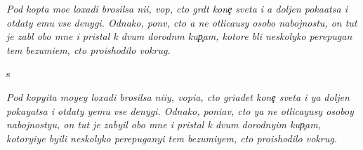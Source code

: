 \documentclass[10pt]{article}
\begin{document}
\noindent\textit{Pod kop{\yi}ta mo{\y}e{\y} loxadi brosilsa ni{\x}i{\y}, vop{\ia}, cto gr{\ia}d{\e}t kone{\c} sveta i {\y}a doljen poka{\y}atsa i otdaty {\y}emu vse denygi. Odnako, pon{\ia}v, cto {\y}a ne otlica{\y}usy osobo{\y} nabojnost{\y}u, on tut je zab{\yi}l obo mne i pristal k dvum dorodn{\yi}m kup{\c}am, kotor{\yi}{\y}e b{\yi}li neskolyko perepugan{\yi} tem bezumi{\y}em, cto proishodilo vokrug.}

\noindent s

\noindent\textit{Pod kopyita moyey loxadi brosilsa ni{\x}iy, vopia, cto griadet kone{\c} sveta i ya doljen pokayatsa i otdaty yemu vse denygi. Odnako, poniav, cto ya ne otlicayusy osoboy nabojnostyu, on tut je zabyil obo mne i pristal k dvum dorodnyim kup{\c}am, kotoryiye byili neskolyko perepuganyi tem bezumiyem, cto proishodilo vokrug.}


\end{document}
